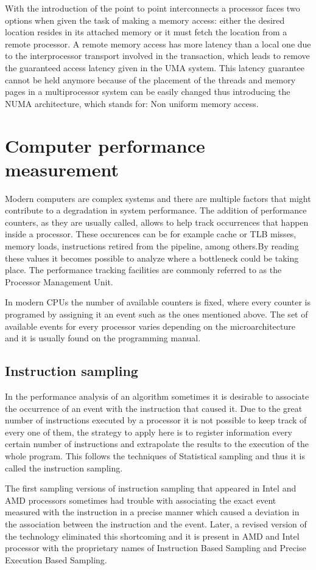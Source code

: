 With the introduction of the point to point interconnects a processor faces two options when given the task of making a memory access: either the desired location resides in its attached memory or it must fetch the location from a remote processor. A remote memory access has more latency than a local one due to the interprocessor transport involved in the transaction, which leads to remove the guaranteed access latency given in the UMA system. This latency guarantee cannot be held anymore because of the placement of the threads and memory pages in a multiprocessor system can be easily changed thus introducing the NUMA architecture, which stands for: Non uniform memory access. 

\section{Computer performance measurement}\label{section:perfmeas}

Modern computers are complex systems and there are multiple factors that might contribute to a degradation in system performance. The addition of performance counters, as they are usually called, allows to help track occurrences that happen inside a processor. These occurences can be for example cache or TLB misses, memory loads, instructions retired from the pipeline, among others.By reading these values it becomes possible to analyze where a bottleneck could be taking place. The performance tracking facilities are commonly referred to as the Processor Management Unit.

In modern CPUs the number of available counters is fixed, where every counter is programed by assigning it an event such as the ones mentioned above. The set of available events for every processor varies depending on the microarchitecture and it is usually found on the programming manual. 

\subsection{Instruction sampling}\label{subsection:sampling}
In the performance analysis of an algorithm sometimes it is desirable to associate the occurrence of an event with the instruction that caused it. Due to the great number of instructions executed by a processor it is not possible to keep track of every one of them, the strategy to apply here is to register information every certain number of instructions and extrapolate the results to the execution of the whole program. This follows the techniques of Statistical sampling and thus it is called the instruction sampling.

The first sampling versions of instruction sampling that appeared in Intel and AMD processors sometimes had trouble with associating the exact event measured with the instruction in a precise manner which caused a deviation in the association between the instruction and the event. Later, a revised version of the technology eliminated this shortcoming and it is present in AMD and Intel processor with the proprietary names of Instruction Based Sampling and Precise Execution Based Sampling. 